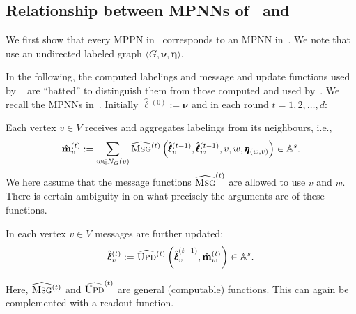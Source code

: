 \documentclass[10pt,a4paper]{article}
\theoremstyle{definition}
\begin{document}
\subsection{Relationship between MPNNs of~\citet{GilmerSRVD17} and~\citet{Loukas2019}}\label{subsec:relationship}
We first show that every MPPN in~\citep{GilmerSRVD17} corresponds to an MPNN in~\citep{Loukas2019}.
We note that~\citet{GilmerSRVD17} use an undirected labeled graph $\langle G,\pmb{\nu},\pmb{\eta}\rangle$. 

In the following, the computed labelings and message and update functions used by ~\citet{GilmerSRVD17} are 
``hatted'' to distinguish them from those computed and used by~\citet{Loukas2019}. We recall the MPNNs in~\citet{GilmerSRVD17}.
Initially $\hat{\pmb{\ell}}{}^{(0)}:=\pmb{\nu}$ and in each round $t=1,2,\ldots,d$:
\noindent
\begin{description}\setlength{\itemsep}{-0.4ex}
\item [Message passing \& aggregation.] Each vertex $v\in V$ receives and aggregates labelings from its neighbours, i.e.,
$$
\hat{\mathbf{m}}^{(t)}_v:=\sum_{w\in N_G(v)}\widehat{\textsc{Msg}}{}^{(t)}\left(\hat{\pmb{\ell}}{}^{(t-1)}_v,\hat{\pmb{\ell}}{}^{(t-1)}_w,v,w,\pmb{\eta}_{(w,v)}\right)\in\mathbb{A}^{s}.
$$
We here assume that the message functions $\widehat{\textsc{Msg}}^{(t)}$ are allowed to use $v$ and $w$. There is certain ambiguity in \citep{GilmerSRVD17} on what precisely the arguments are of these functions.

\item [Updating.] In each vertex $v\in V$ messages are further updated:
$$
\hat{\pmb{\ell}}{}^{(t)}_v:=\widehat{\textsc{Upd}}{}^{(t)}\left(\hat{\pmb{\ell}}^{(t-1)}_v, \hat{\mathbf{m}}_w^{(t)}\right)\in\mathbb{A}^{s}.
$$
\end{description}
Here, $\widehat{\textsc{Msg}}{}^{(t)}$ and $\widehat{\textsc{Upd}}^{(t)}$ are general (computable) functions. This can again be complemented with a readout function.
\end{document}
